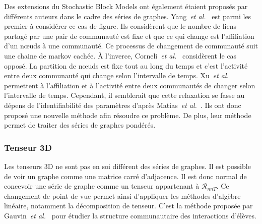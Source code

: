 Des extensions du Stochastic Block Models ont également étaient proposés par différents auteurs dans le cadre des séries de graphes.
Yang~\emph{et al.}~\cite{Yang2011} est parmi les premier à considérer ce cas de figure.
Ils considèrent que le nombre de liens partagé par une pair de communauté est fixe et que ce qui change est l'affiliation d'un n\oe uds à une communauté.
Ce processus de changement de communauté suit une chaine de markov cachée.
\`A l'inverce, Corneli~\emph{et al.}~\cite{Corneli2016} considèrent le cas opposé.
La partition de n\oe uds est fixe tout au long du temps et c'est l'activité entre deux communauté qui change selon l'intervalle de temps.
Xu~\emph{et al.}~\cite{Xu2014} permettent à l'affiliation et à l'activité entre deux communautés de changer selon l'intervalle de temps.
Cependant, il semblerait que cette relaxation se fasse au dépens de l'identifiabilité des paramètres d'après Matias~\emph{et al.}~\cite{Matias2015}.
Ils ont donc proposé une nouvelle méthode afin résoudre ce problème.
De plus, leur méthode permet de traiter des séries de graphes pondérés.

\subsubsection{Tenseur 3D}
Les tenseurs 3D ne sont pas en soi différent des séries de graphes.
Il est possible de voir un graphe comme une matrice carré d'adjacence.
Il est donc normal de concevoir une série de graphe comme un tenseur appartenant à $\mathcal{R}_{nnT}$.
Ce changement de point de vue permet ainsi d'appliquer les méthodes d'algèbre linéaire, notamment la décomposition de tenseur.
C'est la méthode proposée par Gauvin~\emph{et al.}~\cite{Gauvin2014} pour étudier la structure communautaire des interactions d'élèves.



